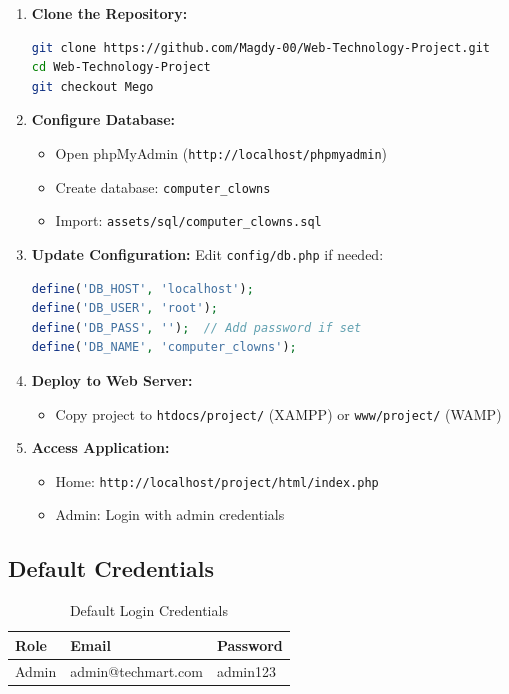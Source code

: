 \documentclass[12pt,a4paper]{article}
\begin{document}
\begin{enumerate}
    \item \textbf{Clone the Repository:}
    \begin{lstlisting}[language=bash]
git clone https://github.com/Magdy-00/Web-Technology-Project.git
cd Web-Technology-Project
git checkout Mego
    \end{lstlisting}
    
    \item \textbf{Configure Database:}
    \begin{itemize}
        \item Open phpMyAdmin (\texttt{http://localhost/phpmyadmin})
        \item Create database: \texttt{computer\_clowns}
        \item Import: \texttt{assets/sql/computer\_clowns.sql}
    \end{itemize}
    
    \item \textbf{Update Configuration:}
    Edit \texttt{config/db.php} if needed:
    \begin{lstlisting}[language=PHP]
define('DB_HOST', 'localhost');
define('DB_USER', 'root');
define('DB_PASS', '');  // Add password if set
define('DB_NAME', 'computer_clowns');
    \end{lstlisting}
    
    \item \textbf{Deploy to Web Server:}
    \begin{itemize}
        \item Copy project to \texttt{htdocs/project/} (XAMPP) or \texttt{www/project/} (WAMP)
    \end{itemize}
    
    \item \textbf{Access Application:}
    \begin{itemize}
        \item Home: \texttt{http://localhost/project/html/index.php}
        \item Admin: Login with admin credentials
    \end{itemize}
\end{enumerate}

\subsection{Default Credentials}

\begin{table}[H]
\centering
\begin{tabular}{@{}lll@{}}
\toprule
\textbf{Role} & \textbf{Email} & \textbf{Password} \\
\midrule
Admin & admin@techmart.com & admin123 \\
\bottomrule
\end{tabular}
\caption{Default Login Credentials}
\end{table}
\end{document}
